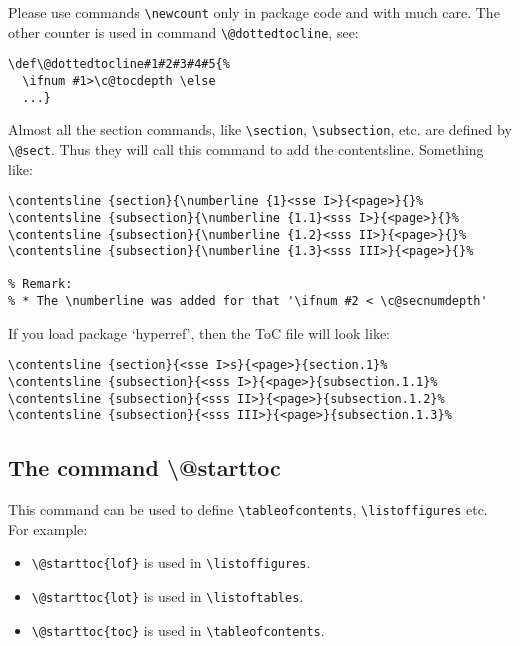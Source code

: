 \documentclass{article}
\begin{document}
Please use commands \verb|\newcount| only in package code and with much care. The other counter is used in command \verb|\@dottedtocline|, see:
\begin{lstlisting}
\def\@dottedtocline#1#2#3#4#5{%
  \ifnum #1>\c@tocdepth \else
  ...}
\end{lstlisting}

Almost all the section commands, like \verb|\section|, \verb|\subsection|, etc. are defined by \verb|\@sect|. Thus they will call 
this command to add the contentsline. Something like:
\begin{lstlisting}
\contentsline {section}{\numberline {1}<sse I>}{<page>}{}%
\contentsline {subsection}{\numberline {1.1}<sss I>}{<page>}{}%
\contentsline {subsection}{\numberline {1.2}<sss II>}{<page>}{}%
\contentsline {subsection}{\numberline {1.3}<sss III>}{<page>}{}%

% Remark:
% * The \numberline was added for that '\ifnum #2 < \c@secnumdepth'
\end{lstlisting}

If you load package `hyperref', then the ToC file will look like:
\begin{lstlisting}
\contentsline {section}{<sse I>s}{<page>}{section.1}%
\contentsline {subsection}{<sss I>}{<page>}{subsection.1.1}%
\contentsline {subsection}{<sss II>}{<page>}{subsection.1.2}%
\contentsline {subsection}{<sss III>}{<page>}{subsection.1.3}%
\end{lstlisting}



\subsection{The command \textbackslash @starttoc}
This command can be used to define \verb|\tableofcontents|, \verb|\listoffigures| etc. For example: 
\begin{itemize}
\item \verb|\@starttoc{lof}| is used in \verb|\listoffigures|. 
\item \verb|\@starttoc{lot}| is used in \verb|\listoftables|.
\item \verb|\@starttoc{toc}| is used in \verb|\tableofcontents|.
\end{itemize}
\end{document}

